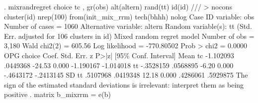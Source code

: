 . mixrandregret choice  tc , gr(obs) alt(altern) rand(tt) id(id) ///
> nocons cluster(id)  nrep(100) from(init_mix_rrm) tech(bhhh)  nolog
{\smallskip}
Case ID variable: obs                          Number of cases    =       1060
Alternative variable: altern                   
Random variable(s): tt                         
{\smallskip}
                                 (Std. Err. adjusted for  106 clusters in id)
{\smallskip}
Mixed random regret model                       Number of obs     =      3,180
                                                Wald chi2(2)      =     605.56
Log likelihood = -770.80502                     Prob > chi2       =     0.0000
{\smallskip}
             {\VBAR}                 OPG
      choice {\VBAR}      Coef.   Std. Err.      z    P>|z|     [95\% Conf. Interval]
Mean         {\VBAR}
          tc {\VBAR}  -1.102093   .0449368   -24.53   0.000    -1.190167   -1.014018
          tt {\VBAR}  -.3528159   .0568895    -6.20   0.000    -.4643172   -.2413145
SD           {\VBAR}
          tt {\VBAR}   .5107968   .0419348    12.18   0.000     .4286061    .5929875
{\smallskip}
The sign of the estimated standard deviations is irrelevant: interpret them as
being positive
{\smallskip}
. matrix b_mixrrm = e(b)
{\smallskip}
